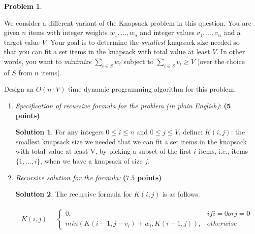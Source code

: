 \documentclass{article}
\theoremstyle{definition}
\newtheorem{problem}{Problem}
\newtheorem*{solution*}{Solution}
\newenvironment{solution}{\begin{solution*}}{{} \end{solution*}}
\newcommand{\grade}[1]{\hfill{\textbf{($\mathbf{#1}$ points)}}}
\begin{document}
\begin{problem}\label{old}

We consider a different variant of the Knapsack problem in this question. You are given $n$ items with integer weights $w_1,\ldots,w_n$ and integer values $v_1,\ldots,v_n$ and a target value $V$. Your goal is to determine the \emph{smallest} knapsack size  needed so that you can fit 
a set items in the knapsack with total value at least $V$. In other words, you want to \emph{minimize} $\sum_{i \in S} w_i$ subject to $\sum_{i \in S} v_i \geq V$ (over the choice of $S$ from $n$ items). 

Design an $O(n \cdot V)$ time dynamic programming algorithm for this problem. 
 


\begin{enumerate}[label=(\alph*)]

	\item \emph{Specification of recursive formula for the problem (in plain English)}: \grade{5}
	
		\medskip
		\begin{solution}
		
		For any integers $0 \leq i \leq n$ and $0 \leq j \leq V$, define: $K(i,j)$:  the smallest knapsack size we needed that we can fit a set items in the knapsack with total value at least V, by  picking  a  subset  of  the  first $i$ items,  i.e.,  items $\{1, ..., i\}$, when we have a knapsack of size $j$.
				
		\end{solution}
		\vfill
		
	\item \emph{Recursive solution for the formula:} \grade{7.5}
	
	
		\medskip
		\begin{solution}
		
		The recursive formula for $K(i,j)$ is as follows: 
	
	\begin{align*}
 		\begin{split}
 			K(i,j)= \left \{
 			\begin{array}{ll}
 				0,                      					        	& if {i = 0} or {j = 0} \\
 				min({K(i-1, j-v_i) + w_i, K(i-1, j)}),               & otherwise
 			\end{array}
		\right.
 		\end{split}
	\end{align*}


\end{solution}
\end{enumerate}
\end{problem}
\end{document}
